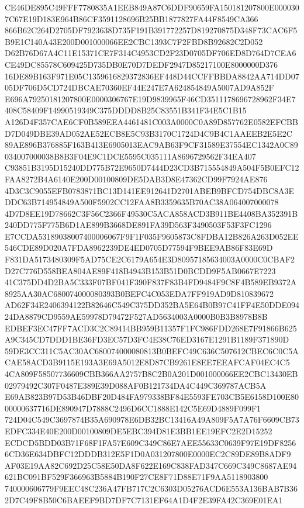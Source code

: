 \documentclass[UTF8,fontset=fandol,zihao=-4,a4paper]{ctexart}
\begin{document}
{{CE46DE895C49FFF7780835A1EEB849A87C6DDF90659FA150181207800E0000307C67E19D183E964B86CF3591128696B25BB1877827FA44F8549CA366
866B62C264D2705DF7923638D735F191B391772257D819270875D348F73CAC6F5B9E1C140A43E200D001000066EE2CBC1393C7F2FBD8B92682C2D052
D62B76D67A4C11E15371CE7F314C4953CD2F23D0705DF706ED8D764D7CEA6CE49DC85578C609425D735DB0E70D7DEDF2947D85217100E8000000D376
16DE89B163F971E05C1359616829372836EF448D44CCFFBBDA8842AA714DD0705DF706D5CD724DBCAE70360EF44E247E7A624854849A5007AD9A852F
E696A79250181207800E0000306767E19D9839965F46CD3511178696728962F34E7408C58409F14990519349C375DDDD8B25C83551B341F34E5C1B15
A126D4F357CAE6CF0B589EEA4461481C003A0000C0A89D857762E0582EFCBBD7D049DBE39AD052AE52ECB8E5C93B3170C1724D4C9B4C1AAEEB2E5E2C
89AE896B376885F163B413E6905013EAC9AB63F9CF31589E37554EC1342A0C89034007000038B8B3F04E9C1DCE5595C035111A8696729562F34EA407
C93851B3195D15240DD775B72E9650D7444D23CD3B715554849A504F5B0EFC12FAA8272B4A6140E200D00100809DE5DAB3D8E47362CD99F7924AE876
4D3C3C9055EFB0783871BC13D141EE912641D2701ABEB9BFCD754DBC8A3EDDC63B714954849A500F5902CC12FAA8B3359635B70AC38A064007000078
4D7D8EE19D78662C3F56C2366F49530C5ACA858ACD3B911BE4408BA352391B240DD775F775B6D1AE899B3668DE891FA39D563F3490503F53F3FC1296
E7CCDA53189038007400006067F9F1F035F9605873C8FDBA12B826A263D052EE546CDE89D020A7FDA8962239DE4ED0705D77594F9BEE9AB86F83E69D
F831DA5173480309F5AD75CE2C6179A654E3D80957185634003A0000C0CBAF2D27C776D558BEA804AE89F418B4943B153B51D0BCDD9F5AB0667E7223
41C375DD4D2BA5C333F07BF041F390F837F83B4FD9484F9C8F4B589EB9372A8925AA30AC680074000080393B0BEFC4C053EDA7FF919AD9D810839672
AD62F34E2406394122B82646C549C375DD352BA5E64B0B97C41FF4E50DDE09424DA8879CD9559AE59978D79472F527AD5634003A0000B0B3B8978B8B
EDBEF3EC47FF7ACD3C2C89414BB959B11357F1FC986FDD268E7F91866B625A9C345CD7DDD1BE36FD3EC57D3FC4E38C76ED3167E1291B1189F371890D
59DE3CC311C5AC30AC680074000080813B0BEFC49C636C507612CBEC6C0C5ACAE58ACD3B9115E193A3E69A5012E8D87CB9261E8EE7EEAFCAF04EC4C5
4CA809F58507736609CBB366AA2757B8C2B0A201D001000066EE2CBC13430EB02979492C307F0487E389E39D088AF0B121734DA4C449C369787ACB5A
E69AB823B97D53B46DBF20D484FA979338BF84E5593FE703CB5E6158D100E8000000637716DE890947D7888C2496D6CC1888E142C5E69D4889F099F1
724D04C549C3697874B35A690978E6DB32BC13416A49A809F5A7A76F6609CB73EDFC334E40E200D00100809DE5EBC394D81E3BB1EE19EFC2E2D15252
ECDCD5BDD03B71F68F1FA57E609C349C86E7AEE55633C0639F97E19DF82566CD36E634DBFC12DDDB312E5F1D0A031207800E0000EC2C89DE89B8ADF9
AF03E19AA82C692D25C58E50DA8F622E169C838FAD347C669C349C8687AE94621BC091BF529F366963B5884B190F27CE8F71D88E71F9AA5118903800
740000606779F9EEC48C236A47FB717C2C6303D05276ACD6E553A136BAB7B362D7C49F8B50C6BAEEF9BD7DF7C7131EF64A1D4F2E39FA42C369E01EA1
}}
\end{document}
